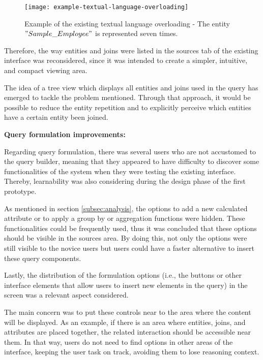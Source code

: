 \begin{figure}[htbp]
	\centering
	\texttt{[image: example-textual-language-overloading]}
	\caption{Example of the existing textual language overloading - The entity $"Sample\_Employee"$ is represented seven times. }
	\label{fig:exampleTextualLanguageOverloading}
\end{figure}

Therefore, the way entities and joins were listed in the sources tab of the existing interface was reconsidered, since it was intended to create a simpler, intuitive, and compact viewing area.

The idea of a tree view which displays all entities and joins used in the query has emerged to tackle the problem mentioned. Through that approach, it would be possible to reduce the entity repetition and to explicitly perceive which entities have a certain entity been joined.

\medskip

\textbf{Query formulation improvements: }

\medskip

Regarding query formulation, there was several users who are not accustomed to the query builder, meaning that they appeared to have difficulty to discover some functionalities of the system when they were testing the existing interface. Thereby, learnability was also considering during the design phase of the first prototype.

As mentioned in section \ref{subsec:analysis}, the options to add a new calculated attribute or to apply a group by or aggregation functions were hidden. These functionalities could be frequently used, thus it was concluded that these options should be visible in the sources area. By doing this, not only the options were still visible to the novice users but users could have a faster alternative to insert these query components.


Lastly, the distribution of the formulation options (i.e., the buttons or other interface elements that allow users to insert new elements in the query) in the screen was a relevant aspect considered.

The main concern was to put these controls near to the area where the content will be displayed. As an example, if there is an area where entities, joins, and attributes are placed together, the related interaction should be accessible near them. In that way, users do not need to find options in other areas of the interface, keeping the user task on track, avoiding them to lose reasoning context.

